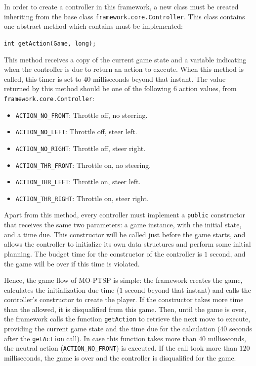 \documentclass[conference]{IEEEtran}
\newcommand{\code}[1]{{\lstinline!#1!}}
\begin{document}
In order to create a controller in this framework, a new class must be created inheriting from the base class \code{framework.core.Controller}. This class contains one abstract method which contains must be implemented: 

\begin{center}
\code{int getAction(Game, long);}
\end{center}

This method receives a copy of the current game state and a variable indicating when the controller is due to return an action to execute. When this method is called, this timer is set to $40$ milliseconds beyond that instant. The value returned by this method should be one of the following $6$ action values, from \code{framework.core.Controller}:

\begin{itemize}
\item \code{ACTION_NO_FRONT}: Throttle off, no steering.
\item \code{ACTION_NO_LEFT}: Throttle off, steer left.
\item \code{ACTION_NO_RIGHT}: Throttle off, steer right.
\item \code{ACTION_THR_FRONT}: Throttle on, no steering. 
\item \code{ACTION_THR_LEFT}: Throttle on, steer left. 
\item \code{ACTION_THR_RIGHT}: Throttle on, steer right.
\end{itemize}

Apart from this method, every controller must implement a \code{public} constructor that receives the same two parameters: a game instance, with the initial state, and a time due. This constructor will be called just before the game starts, and allows the controller to initialize its own data structures and perform some initial planning. The budget time for the constructor of the controller is $1$ second, and the game will be over if this time is violated.

Hence, the game flow of MO-PTSP is simple: the framework creates the game, calculates the initialization due time ($1$ second beyond that instant) and calls the controller's constructor to create the player. If the constructor takes more time than the allowed, it is disqualified from this game. Then, until the game is over, the framework calls the function \code{getAction} to retrieve the next move to execute, providing the current game state and the time due for the calculation ($40$ seconds after the \code{getAction} call). In case this function takes more than $40$ milliseconds, the neutral action (\code{ACTION_NO_FRONT}) is executed. If the call took more than $120$ milliseconds, the game is over and the controller is disqualified for the game.
\end{document}
